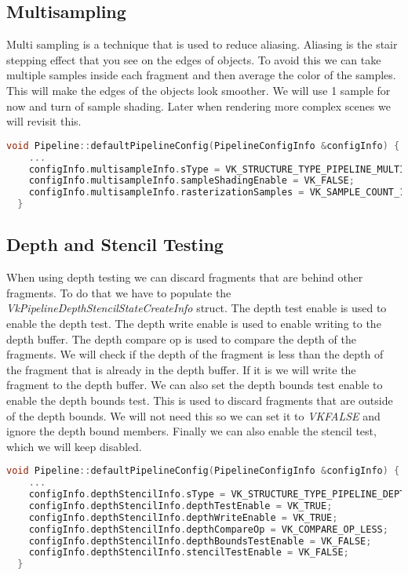 \documentclass[12pt]{report} \usepackage{preamble}
\begin{document}
\subsection{Multisampling}

Multi sampling is a technique that is used to reduce aliasing. Aliasing is the stair stepping effect that you see on the edges of objects.
To avoid this we can take multiple samples inside each fragment and then average the color of the samples. This will make the edges
of the objects look smoother. We will use 1 sample for now and turn of sample shading. Later when rendering more complex scenes
we will revisit this.

\begin{lstlisting}[language=C++]
void Pipeline::defaultPipelineConfig(PipelineConfigInfo &configInfo) {
    ...
    configInfo.multisampleInfo.sType = VK_STRUCTURE_TYPE_PIPELINE_MULTISAMPLE_STATE_CREATE_INFO;
    configInfo.multisampleInfo.sampleShadingEnable = VK_FALSE;
    configInfo.multisampleInfo.rasterizationSamples = VK_SAMPLE_COUNT_1_BIT;
  }
\end{lstlisting}

\subsection{Depth and Stencil Testing}

When using depth testing we can discard fragments that are behind other fragments. To do that we have to populate the
\textit{VkPipelineDepthStencilStateCreateInfo} struct. The depth test enable is used to enable the depth test. The depth
write enable is used to enable writing to the depth buffer. The depth compare op is used to compare the depth of the
fragments. We will check if the depth of the fragment is less than the depth of the fragment that is already in the
depth buffer. If it is we will write the fragment to the depth buffer. We can also set the depth bounds test enable
to enable the depth bounds test. This is used to discard fragments that are outside of the depth bounds. We will not
need this so we can set it to \textit{VK\textunderscore FALSE} and ignore the depth bound members. Finally we can also enable the stencil
test, which we will keep disabled.

\begin{lstlisting}[language=C++]
void Pipeline::defaultPipelineConfig(PipelineConfigInfo &configInfo) {
    ...
    configInfo.depthStencilInfo.sType = VK_STRUCTURE_TYPE_PIPELINE_DEPTH_STENCIL_STATE_CREATE_INFO;
    configInfo.depthStencilInfo.depthTestEnable = VK_TRUE;
    configInfo.depthStencilInfo.depthWriteEnable = VK_TRUE;
    configInfo.depthStencilInfo.depthCompareOp = VK_COMPARE_OP_LESS;
    configInfo.depthStencilInfo.depthBoundsTestEnable = VK_FALSE;
    configInfo.depthStencilInfo.stencilTestEnable = VK_FALSE;
  }
\end{lstlisting}
\end{document}
